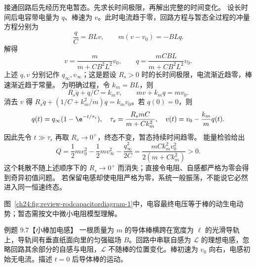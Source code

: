 \begin{xesolution}
接通回路后先经历充电暂态。先求长时间极限，再解出完整的时间变化。
设长时间后电容带电量为 $q$、棒速为 $v$。此时电流趋于零，回路方程与暂态全过程的冲量方程分别为
\begin{equation}
  \frac qC=BLv,
  \qquad m(v-v_0)=-BLq.
\end{equation}
解得
\begin{equation}
  \boxed{v=\frac{m}{m+CB^2L^2}v_0},
  \qquad
  \boxed{q=\frac{mCBL}{m+CB^2L^2}v_0}.
\end{equation}
上述 $q,v$ 分别记作 $q_\infty,v_\infty$；这是题设 $R_s>0$ 时的长时间极限，电流渐近趋零，棒速渐近趋于常量。
为明确过程，令 $k_m=BL$，则
\[
 R_s\dot q+q/C=k_mv,\qquad mv+k_mq=mv_0.
\]
消去 $v$ 得 $R_s\dot q+(1/C+k_m^2/m)q=k_mv_0$。若 $q(0)=0$，则
\[
 q(t)=q_\infty(1-\e^{-t/\tau_s}),\quad
 \tau_s=\frac{R_smC}{m+Ck_m^2},\quad
 v(t)=v_0-\frac{k_m}{m}q(t).
\]
因此先令 $t\gg\tau_s$ 再取 $R_s\to0^+$，终态不变，暂态持续时间趋零。
能量检验给出
\[
 Q=\frac12mv_0^2-\frac12mv_\infty^2-\frac{q_\infty^2}{2C}
 =\frac{mCk_m^2v_0^2}{2(m+Ck_m^2)}>0.
\]
这个耗散不随上述顺序下的 $R_s\to0^+$ 而消失；直接令电阻、自感都严格为零会得到奇异初值问题。
若保留电感却使电阻严格为零，系统一般振荡，不能说它必然进入同一恒速终态。

图~\ref{ch24:fig:review-rodcapacitordiagram-1}中，电容最终电压等于棒的动生电动势；暂态需按文中微小电阻模型理解。
\par\noindent\begin{minipage}{\linewidth}
\rodCapacitorDiagram
{}\label{ch24:fig:review-rodcapacitordiagram-1}
\end{minipage}\par\medskip
\end{xesolution}

\begin{origexamplebox}{例题 9.7【小棒加电感】}
一根质量为 $m$ 的导体棒横跨在宽度为 $\ell$ 的光滑导轨上，导轨间有垂直纸面向里的匀强磁场 $B$。回路中串联自感为 $\mathcal L$
的理想电感，忽略回路其余部分的自感与电阻，$\mathcal L$ 不随棒的位置变化。棒初速为 $v_0$ 向右，电感初始无电流。描述 $t=0$ 后导体棒的运动。

%
\begin{center}\end{center}
\label{fig:em24-question-7}
\end{origexamplebox}

